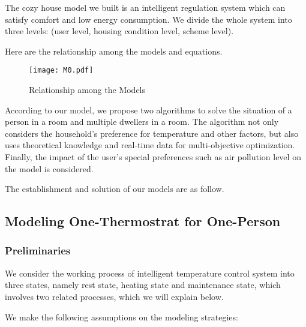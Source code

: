 \documentclass{mcmthesis}
\begin{document}
		The cozy house model we built is an intelligent regulation system which can satisfy comfort and low energy consumption. We divide the whole system into three levels: (user level, housing condition level, scheme level). 
		
		Here are the relationship among the models and equations.
		
		\begin{figure}[h]
			\small
			\centering
			\texttt{[image: M0.pdf]}
			\caption{Relationship among the Models} \label{fig:process1}
		\end{figure}
	
			According to our model, we propose two algorithms to solve the situation of a person in a room and multiple dwellers in a room. The algorithm not only considers the household's preference for temperature and other factors, but also uses theoretical knowledge and real-time data for multi-objective optimization. Finally, the impact of the user's special preferences such as air pollution level on the model is considered. 
		
		 	The establishment and solution of our models are as follow.
		
		\subsection{Modeling One-Thermostrat for One-Person}
			\subsubsection{Preliminaries}
	
				We consider the working process of intelligent temperature control system into three states, namely rest state, heating state and maintenance state, which involves two related processes, which we will explain below.
			
				We make the following assumptions on the modeling strategies:
				
\end{document}
